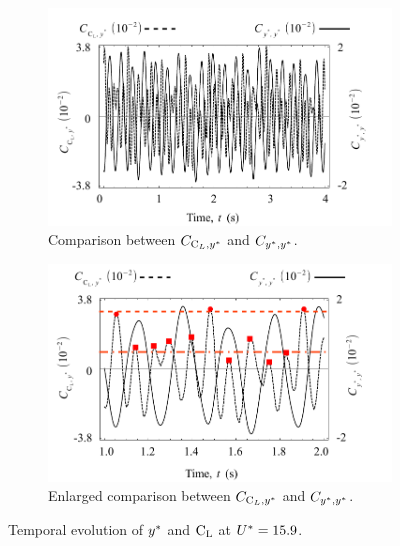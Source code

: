 \documentclass[oneside]{utmthesis}
\begin{document}
\begin{figure}[H]
  \centering
  \begin{subfigure}[h]{0.7\textwidth}
    \includegraphics[width=\textwidth]{figs/tempEvoCompare-a}
    \caption{Comparison between $C_{\text{C}_{L},y^{*}}$ and $C_{y^{*},y^{*}}$.}
    \label{fig:tempEvoCompare-a}
  \end{subfigure}

  \begin{subfigure}[h]{0.7\textwidth}
    \includegraphics[width=\textwidth]{figs/tempEvoCompare-b}
    \caption{Enlarged comparison between $C_{\text{C}_{L},y^{*}}$ and $C_{y^{*},y^{*}}$.}
    \label{fig:tempEvoCompare-b}
  \end{subfigure}
  \caption{Temporal evolution of $y^{*}$ and $\text{C}_{\text{L}}$ at $U^{*} = 15.9$.} \label{fig:tempEvoCompare}
\end{figure}
\end{document}
